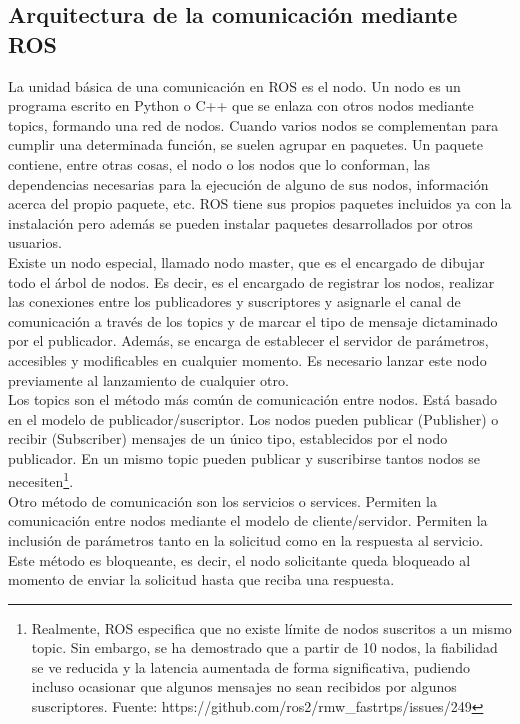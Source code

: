 
\subsection{Arquitectura de la comunicación mediante ROS}

La unidad básica de una comunicación en ROS es el nodo. Un nodo es un programa escrito en Python o C++ que se enlaza con otros nodos mediante topics, formando una red de nodos. Cuando varios nodos se complementan para cumplir una determinada función, se suelen agrupar en paquetes. Un paquete contiene, entre otras cosas, el nodo o los nodos que lo conforman, las dependencias necesarias para la ejecución de alguno de sus nodos, información acerca del propio paquete, etc. ROS tiene sus propios paquetes incluidos ya con la instalación pero además se pueden instalar paquetes desarrollados por otros usuarios.\\

Existe un nodo especial, llamado nodo master, que es el encargado de dibujar todo el árbol de nodos. Es decir, es el encargado de registrar los nodos, realizar las conexiones entre los publicadores y suscriptores y asignarle el canal de comunicación a través de los topics y de marcar el tipo de mensaje dictaminado por el publicador. Además, se encarga de establecer el servidor de parámetros, accesibles y modificables en cualquier momento. Es necesario lanzar este nodo previamente al lanzamiento de cualquier otro. \\

Los topics son el método más común de comunicación entre nodos. Está basado en el modelo de publicador/suscriptor. Los nodos pueden publicar (Publisher) o recibir (Subscriber) mensajes de un único tipo, establecidos por el nodo publicador. En un mismo topic pueden publicar y suscribirse tantos nodos se necesiten\footnote{Realmente, ROS especifica que no existe límite de nodos suscritos a un mismo topic. Sin embargo, se ha demostrado que a partir de 10 nodos, la fiabilidad se ve reducida y la latencia aumentada de forma significativa, pudiendo incluso ocasionar que algunos mensajes no sean recibidos por algunos suscriptores. Fuente: https://github.com/ros2/rmw\_fastrtps/issues/249}. \\

Otro método de comunicación son los servicios o services. Permiten la comunicación entre nodos mediante el modelo de cliente/servidor. Permiten la inclusión de parámetros tanto en la solicitud como en la respuesta al servicio. Este método es bloqueante, es decir, el nodo solicitante queda bloqueado al momento de enviar la solicitud hasta que reciba una respuesta.\\

